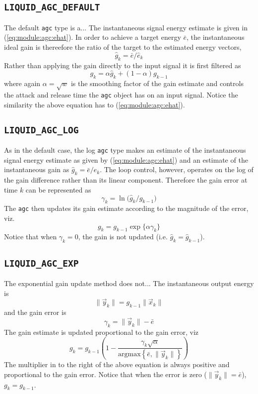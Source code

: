 \subsection{{\tt LIQUID\_AGC\_DEFAULT}}
The default {\tt agc} type is a... 
%
The instantaneous signal energy estimate is given in
(\ref{eq:module:agc:ehat}).
In order to achieve a target energy $\bar{e}$, the instantaneous ideal gain is
thereefore the ratio of the target to the estimated energy vectors,
\[
    \hat{g}_k = \bar{e} / \hat{e}_k
\]
Rather than applying the gain directly to the input signal it is first
filtered as
\[
    g_k = \alpha \hat{g}_k + (1-\alpha) g_{k-1}
\]
where again $\alpha = \sqrt{w}$ is the smoothing factor of the gain estimate
and controls the attack and release time the {\tt agc} object has on an input
signal.
Notice the similarity the above equation has to (\ref{eq:module:agc:ehat}).

\subsection{{\tt LIQUID\_AGC\_LOG}}
As in the default case, the log {\tt agc} type makes an estimate of the
instantaneous signal energy estimate as given by (\ref{eq:module:agc:ehat})
and an estimate of the instantaneous gain as
$\hat{g}_k = \bar{e} / \hat{e}_k$.
The loop control, however, operates on the log of the gain difference rather
than its linear component.
Therefore the gain error at time $k$ can be represented as
\[
    \gamma_k = \ln\bigl( \hat{g}_k / g_{k-1} \bigr)
\]
The {\tt agc} then updates its gain estimate according to the magnitude of the
error, viz.
\[
    g_k = g_{k-1} \exp\bigl\{ \alpha \gamma_k \bigr\}
\]
Notice that when $\gamma_k=0$, the gain is not updated
(i.e. $\hat{g}_k = \hat{g}_{k-1}$).

\subsection{{\tt LIQUID\_AGC\_EXP}}
The exponential gain update method does not...
The instantaneous output energy is
\[
    \|\vec{y}_k\| = g_{k-1}\|\vec{x}_k\|
\]
and the gain error is
\[
    \gamma_k = \| \vec{y}_k\| - \bar{e}
\]
The gain estimate is updated proportional to the gain error, viz
\[
    g_k =
        g_{k-1} \left(1 -
         \frac{
            \gamma_k \sqrt{\alpha}
        }{
            \text{argmax}\left\{\bar{e}, \|\vec{y}_k\|\right\}
        }
    \right)
\]
The multiplier in to the right of the above equation is always positive
and proportional to the gain error.
Notice that when the error is zero ($\| \vec{y}_k \| = \bar{e}$),
$g_k = g_{k-1}$.



